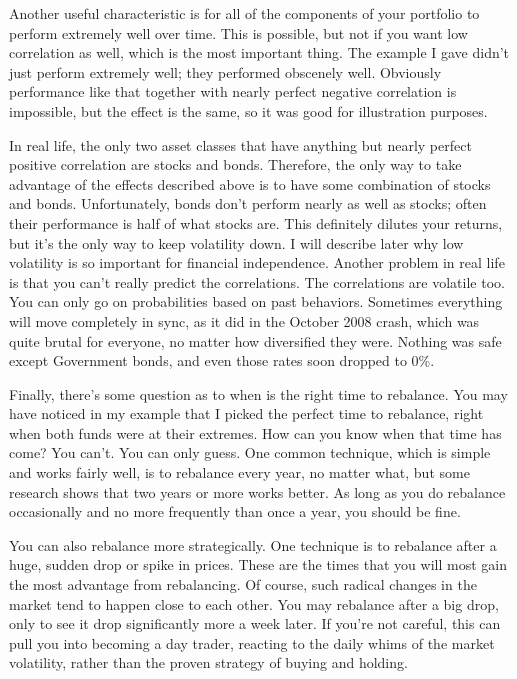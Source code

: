 Another useful characteristic is for all of the components of your portfolio to perform extremely well over time. This is possible, but not if you want low correlation as well, which is the most important thing. The example I gave didn't just perform extremely well; they performed obscenely well. Obviously performance like that together with nearly perfect negative correlation is impossible, but the effect is the same, so it was good for illustration purposes.

In real life, the only two asset classes that have anything but nearly perfect positive correlation are stocks and bonds. Therefore, the only way to take advantage of the effects described above is to have some combination of stocks and bonds. Unfortunately, bonds don't perform nearly as well as stocks; often their performance is half of what stocks are. This definitely dilutes your returns, but it's the only way to keep volatility down. I will describe later why low volatility is so important for financial independence.
Another problem in real life is that you can't really predict the correlations. The correlations are volatile too. You can only go on probabilities based on past behaviors. Sometimes everything will move completely in sync, as it did in the October 2008 crash, which was quite brutal for everyone, no matter how diversified they were. Nothing was safe except Government bonds, and even those rates soon dropped to 0\%.

Finally, there's some question as to when is the right time to rebalance. You may have noticed in my example that I picked the perfect time to rebalance, right when both funds were at their extremes. How can you know when that time has come? You can't. You can only guess. One common technique, which is simple and works fairly well, is to rebalance every year, no matter what, but some research shows that two years or more works better. As long as you do rebalance occasionally and no more frequently than once a year, you should be fine.

You can also rebalance more strategically. One technique is to rebalance after a huge, sudden drop or spike in prices. These are the times that you will most gain the most advantage from rebalancing. Of course, such radical changes in the market tend to happen close to each other. You may rebalance after a big drop, only to see it drop significantly more a week later. If you're not careful, this can pull you into becoming a day trader, reacting to the daily whims of the market volatility, rather than the proven strategy of buying and holding.

